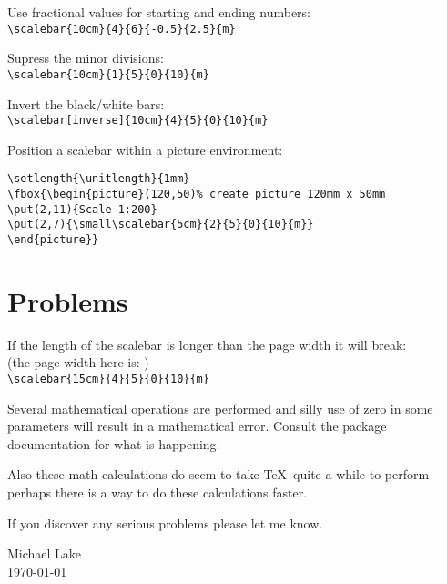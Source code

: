 \documentclass[a4paper,12pt]{article}
\begin{document}
\newpage
Use fractional values for starting and ending numbers:\\
\verb+\scalebar{10cm}{4}{6}{-0.5}{2.5}{m}+\\
\vspace{\baselineskip}


Supress the minor divisions:\\
\verb+\scalebar{10cm}{1}{5}{0}{10}{m}+\\
\vspace{\baselineskip}


Invert the black/white bars:\\
\verb+\scalebar[inverse]{10cm}{4}{5}{0}{10}{m}+\\
\vspace{\baselineskip}


Position a scalebar within a picture environment:
\begin{verbatim}
\setlength{\unitlength}{1mm}
\fbox{\begin{picture}(120,50)% create picture 120mm x 50mm
\put(2,11){Scale 1:200}
\put(2,7){\small\scalebar{5cm}{2}{5}{0}{10}{m}}
\end{picture}}
\end{verbatim}
\setlength{\unitlength}{1mm}

\newpage
\section*{Problems}

If the length of the scalebar is longer than the page width it will break:\\
(the page width here is: \the\textwidth)\\
\verb+\scalebar{15cm}{4}{5}{0}{10}{m}+\\
\vspace{\baselineskip}

Several mathematical operations are performed and silly use of zero in 
some parameters will result in a mathematical error. Consult the package 
documentation for what is happening. 

Also these math calculations do seem to take 
\TeX\ quite a while to perform -- perhaps there is a way to do 
these calculations faster.

If you discover any serious problems please let me know.


\vfill

Michael Lake\\ 
\today
\end{document}
